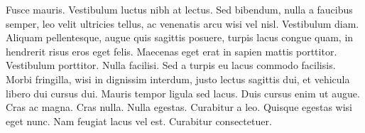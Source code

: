 Fusce mauris. Vestibulum luctus nibh at lectus. Sed bibendum, nulla a faucibus
semper, leo velit ultricies tellus, ac venenatis arcu wisi vel nisl. Vestibulum
diam. Aliquam pellentesque, augue quis sagittis posuere, turpis lacus congue
quam, in hendrerit risus eros eget felis. Maecenas eget erat in sapien mattis
porttitor. Vestibulum porttitor. Nulla facilisi. Sed a turpis eu lacus commodo
facilisis. Morbi fringilla, wisi in dignissim interdum, justo lectus sagittis dui, et
vehicula libero dui cursus dui. Mauris tempor ligula sed lacus. Duis cursus enim
ut augue. Cras ac magna. Cras nulla. Nulla egestas. Curabitur a leo. Quisque
egestas wisi eget nunc. Nam feugiat lacus vel est. Curabitur consectetuer.